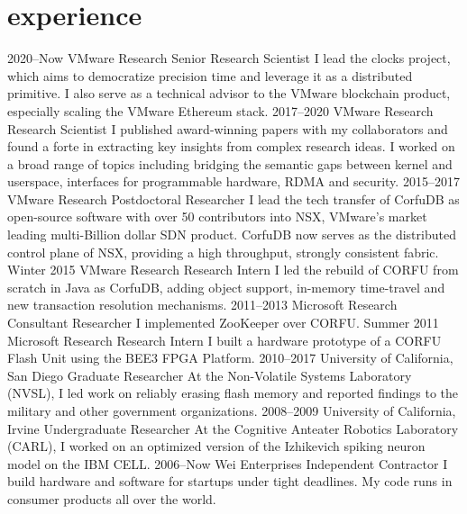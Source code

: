 \section{experience}

\begin{entrylist}
\entry
{2020--Now}
{VMware Research}
{Senior Research Scientist}
{\small I lead the clocks project, which aims to democratize precision time and leverage it as a distributed primitive.
I also serve as a technical advisor to the VMware blockchain product, especially scaling the VMware Ethereum stack.}
\entry
{2017--2020}
{VMware Research}
{Research Scientist}
{\small I published award-winning papers with my collaborators and found a forte in extracting 
 key insights from complex research ideas. I worked on a broad range of topics including
 bridging the semantic gaps between kernel and userspace, interfaces for programmable hardware, 
 RDMA and security. }
\entry
{2015--2017}
{VMware Research}
{Postdoctoral Researcher}
{\small I lead the tech transfer of CorfuDB as open-source software with over 50 contributors into NSX, VMware's market leading multi-Billion dollar SDN product. 
CorfuDB now serves as the distributed control plane of NSX, providing a high throughput, strongly consistent fabric.}
\entry
{Winter 2015}
{VMware Research}
{Research Intern}
{\small I led the rebuild of CORFU from scratch in Java as CorfuDB, adding object support, in-memory time-travel and new transaction resolution mechanisms.}
\entry
{2011--2013}
{Microsoft Research}
{Consultant Researcher}
{\small I implemented ZooKeeper over CORFU.}
\entry
{Summer 2011}
{Microsoft Research}
{Research Intern}
{\small I built a hardware prototype of a CORFU Flash Unit using the BEE3 FPGA Platform.}
\entry
{2010--2017}
{University of California, San Diego}
{Graduate Researcher}
{\small At the Non-Volatile Systems Laboratory (NVSL), I led work on reliably erasing flash memory and reported findings to the military and other government organizations.}
\entry
{2008--2009}
{University of California, Irvine}
{Undergraduate Researcher}
{\small At the Cognitive Anteater Robotics Laboratory (CARL), I worked on an optimized version of the Izhikevich spiking neuron model on the IBM CELL.}
\entry
{2006--Now}
{Wei Enterprises}
{Independent Contractor}
{\small I build hardware and software for startups under tight deadlines. My code runs in consumer products all over the world.}
\end{entrylist}